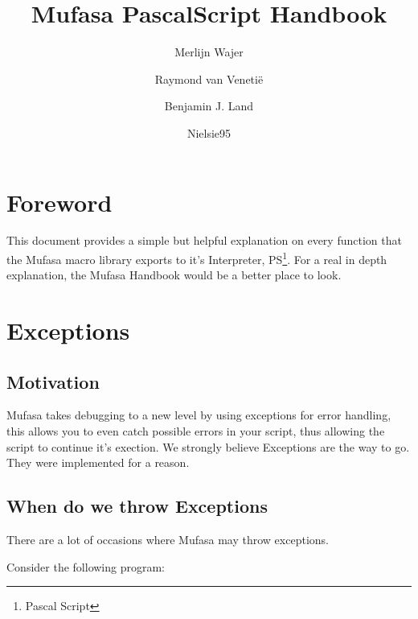 \documentclass[a4paper]{report}
\begin{document}
\title{Mufasa PascalScript Handbook}
\author{Merlijn Wajer \and Raymond van Veneti\"{e}
        \and Benjamin J. Land \and Nielsie95}


\def\pproc{\textbf{procedure}}
\def\pfunc{\textbf{function}}
\newcommand{\pvtype}[1]{{\color{typeGreen}{#1}};}
\newcommand{\pvtypel}[1]{{\color{typeGreen}{#1}}}
\newcommand{\pvname}[1]{{\color{typeRed}{#1}}:}
\newcommand{\mname}[1]{{\color{blue}{#1}}}
\newcommand{\pvtotal}[2]{{\pvname{#1}} {\pvtype{#2}}} %


\maketitle
\tableofcontents

\chapter{Foreword}

This document provides a simple but helpful explanation on every function that
the Mufasa macro library exports to it's Interpreter, PS\footnote{Pascal
Script}. For a real in depth explanation, the Mufasa Handbook would be a better
place to look.

\chapter{Exceptions}

\section{Motivation}
Mufasa takes debugging to a new level by using exceptions for error handling,
this allows you to even catch possible errors in your script, thus allowing
the script to continue it's exection. We strongly believe Exceptions are the
way to go. They were implemented for a reason.

\section{When do we throw Exceptions}

There are a lot of occasions where Mufasa may throw exceptions.

Consider the following program:
\end{document}
